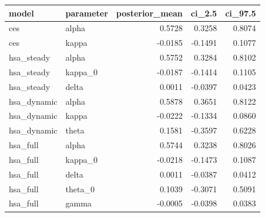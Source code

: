 \begin{tabular}{llrrr}
\toprule
model & parameter & posterior\_mean & ci\_2.5 & ci\_97.5 \\
\midrule
ces & alpha & 0.5728 & 0.3258 & 0.8074 \\
ces & kappa & -0.0185 & -0.1491 & 0.1077 \\
hsa\_steady & alpha & 0.5752 & 0.3284 & 0.8102 \\
hsa\_steady & kappa\_0 & -0.0187 & -0.1414 & 0.1105 \\
hsa\_steady & delta & 0.0011 & -0.0397 & 0.0423 \\
hsa\_dynamic & alpha & 0.5878 & 0.3651 & 0.8122 \\
hsa\_dynamic & kappa & -0.0222 & -0.1334 & 0.0860 \\
hsa\_dynamic & theta & 0.1581 & -0.3597 & 0.6228 \\
hsa\_full & alpha & 0.5744 & 0.3238 & 0.8026 \\
hsa\_full & kappa\_0 & -0.0218 & -0.1473 & 0.1087 \\
hsa\_full & delta & 0.0011 & -0.0387 & 0.0412 \\
hsa\_full & theta\_0 & 0.1039 & -0.3071 & 0.5091 \\
hsa\_full & gamma & -0.0005 & -0.0398 & 0.0383 \\
\bottomrule
\end{tabular}
